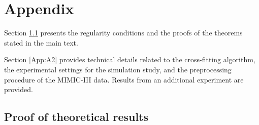 \documentclass{article}
\begin{document}










%









%
%
%
%
%
%
%
%
%
%
\newpage
\appendix
%
%
%
%
%
\section{Appendix}
Section \ref{App:A1} presents the regularity conditions and the proofs of the theorems stated in the main text.

Section \ref{App:A2} provides technical details related to the cross-fitting algorithm, the experimental settings for the simulation study, and the preprocessing procedure of the MIMIC-III data. Results from an additional experiment are provided.

\subsection{Proof of theoretical results} \label{App:A1}
\end{document}
